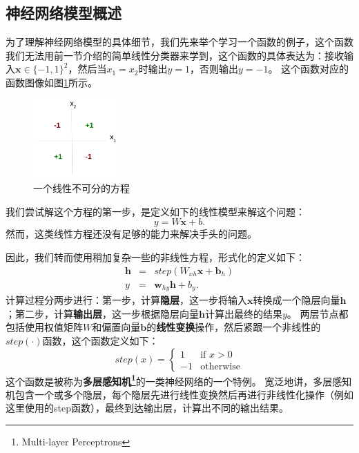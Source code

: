 \documentclass[10pt,a4paper]{ctexart}
\begin{document}
\subsection{神经网络模型概述}
为了理解神经网络模型的具体细节，我们先来举个学习一个函数的例子，这个函数我们无法用前一节介绍的简单线性分类器来学到，这个函数的具体表达为：接收输入$\textbf{x} \in \{-1,1\}^2$，然后当$x_1=x_2$时输出$y=1$，否则输出$y=-1$。
这个函数对应的函数图像如图\ref{fig:7}所示。

\begin{figure}[H]
\centering
\includegraphics[width=0.3\textwidth]{fig7.png}
\caption{一个线性不可分的方程}
\label{fig:7}
\end{figure}

我们尝试解这个方程的第一步，是定义如下的线性模型来解这个问题：
\begin{equation}\label{eq:33}
 y = W\textbf{x} + b.
\end{equation}
然而，这类线性方程还没有足够的能力来解决手头的问题。

因此，我们转而使用稍加复杂一些的非线性方程，形式化的定义如下：
\begin{eqnarray}
 \textbf{h} & = & step(W_{xh}\textbf{x} + \textbf{b}_h) \nonumber \\
 y & = & \textbf{w}_{hy}\textbf{h} + b_y. \label{eq:34}
\end{eqnarray}
计算过程分两步进行：第一步，计算\textbf{隐层}，这一步将输入$\textbf{x}$转换成一个隐层向量$\textbf{h}$；第二步，计算\textbf{输出层}，这一步根据隐层向量$\textbf{h}$计算出最终的结果$y$。
两层节点都包括使用权值矩阵$W$和偏置向量$\textbf{b}$的\textbf{线性变换}操作，然后紧跟一个非线性的$step(\cdot)$函数，这个函数定义如下：
\begin{equation}\label{eq:35}
 step(x) = \left\{ \begin{array}{ll}
  1 & \textrm{if $x > 0$} \\
  -1 & \textrm{otherwise}
  \end{array} \right. 
\end{equation}
这个函数是被称为\textbf{多层感知机\footnote{Multi-layer Perceptrons}}的一类神经网络的一个特例。
宽泛地讲，多层感知机包含一个或多个隐层，每个隐层先进行线性变换然后再进行非线性化操作（例如这里使用的step函数），最终到达输出层，计算出不同的输出结果。
\end{document}
